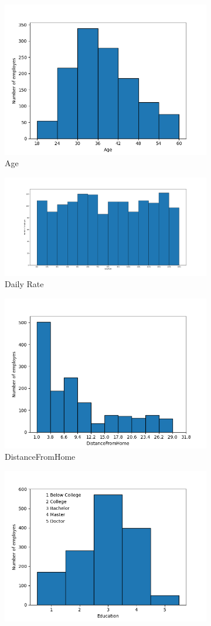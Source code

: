 \documentclass[english]{article}
\begin{document}
\begin{figure} [h]
\centering
\begin{subfigure}{.5\textwidth}
\centering
  \includegraphics[width=.5\linewidth]{age.png}
  \caption{Age}
  \label{fig:sfig1}
\end{subfigure}%
\begin{subfigure}{.5\textwidth}
\centering
  \includegraphics[width=.5\linewidth]{dailyrate.png}
  \caption{Daily Rate}
  \label{fig:sfig2}
\end{subfigure}%
\begin{subfigure}{.5\textwidth}
  \centering
  \includegraphics[width=.5\linewidth]{DistanceFromHome.png}
  \caption{DistanceFromHome}
  \label{fig:sfig3}
\end{subfigure}
\begin{subfigure}{.5\textwidth}
  \centering
  \includegraphics[width=.5\linewidth]{Education.png}

\end{subfigure}
\end{figure}
\end{document}
